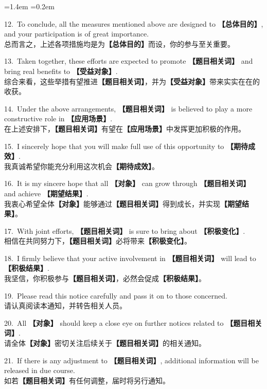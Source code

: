 \documentclass[11pt,a4paper]{ctexart}
\newcommand{\fillin}[1]{{\bfseries【#1】}}
\newenvironment{eg}{%
  \par\addvspace{4pt}%
  \begin{list}{}{\leftmargin=1.4em \rightmargin=0.2em \listparindent=0pt
    \itemindent=0pt \topsep=0pt \parsep=2pt \itemsep=2pt \partopsep=0pt}%
  \item\relax
}{%
  \end{list}\addvspace{5pt}%
}
\begin{document}
\begin{eg}
12.\ To conclude, all the measures mentioned above are designed to \fillin{总体目的}, and your participation is of great importance.\\
总而言之，上述各项措施均是为\fillin{总体目的}而设，你的参与至关重要。

13.\ Taken together, these efforts are expected to promote \fillin{题目相关词} and bring real benefits to \fillin{受益对象}.\\
综合来看，这些举措有望推进\fillin{题目相关词}，并为\fillin{受益对象}带来实实在在的收获。

14.\ Under the above arrangements, \fillin{题目相关词} is believed to play a more constructive role in \fillin{应用场景}.\\
在上述安排下，\fillin{题目相关词}有望在\fillin{应用场景}中发挥更加积极的作用。

15.\ I sincerely hope that you will make full use of this opportunity to \fillin{期待成效}.\\
我真诚希望你能充分利用这次机会\fillin{期待成效}。

16.\ It is my sincere hope that all \fillin{对象} can grow through \fillin{题目相关词} and achieve \fillin{期望结果}.\\
我衷心希望全体\fillin{对象}能够通过\fillin{题目相关词}得到成长，并实现\fillin{期望结果}。

17.\ With joint efforts, \fillin{题目相关词} is sure to bring about \fillin{积极变化}.\\
相信在共同努力下，\fillin{题目相关词}必将带来\fillin{积极变化}。

18.\ I firmly believe that your active involvement in \fillin{题目相关词} will lead to \fillin{积极结果}.\\
我坚信，你积极参与\fillin{题目相关词}，必然会促成\fillin{积极结果}。

19.\ Please read this notice carefully and pass it on to those concerned.\\
请认真阅读本通知，并转告相关人员。

20.\ All \fillin{对象} should keep a close eye on further notices related to \fillin{题目相关词}.\\
请全体\fillin{对象}密切关注后续关于\fillin{题目相关词}的相关通知。

21.\ If there is any adjustment to \fillin{题目相关词}, additional information will be released in due course.\\
如若\fillin{题目相关词}有任何调整，届时将另行通知。
\end{eg}
\end{document}
